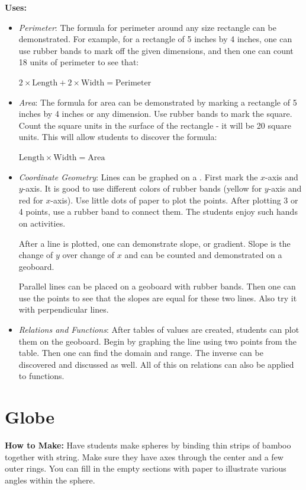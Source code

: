 \noindent\textbf{Uses:}
\begin{itemize}
\item \emph{Perimeter}: The formula for perimeter around any size rectangle can be demonstrated. For example, for a rectangle of 5 inches by 4 inches, one can use rubber bands to mark off the given dimensions, and then one can count 18 units of perimeter to see that:
\begin{center}
$2 \times \text{Length} + 2 \times \text{Width} = \text{Perimeter}$
\end{center}
\item \emph{Area}: The formula for area can be demonstrated by marking a rectangle of 5 inches by 4 inches or any dimension. Use rubber bands to mark the square. Count the square units in the surface of the rectangle - it will be 20 square units. This will allow students to discover the formula:
\begin{center}
$\text{Length} \times \text{Width} = \text{Area} $
\end{center}
\item \emph{Coordinate Geometry}: Lines can be graphed on a . First mark the $x$-axis and $y$-axis. It is good to use different colors of rubber bands (yellow for $y$-axis and red for $x$-axis). Use little dots of paper to plot the points. After plotting 3 or 4 points, use a rubber band to connect them. The students enjoy such hands on activities.

After a line is plotted, one can demonstrate slope, or gradient. Slope is the change of $y$ over change of $x$ and can be counted and demonstrated on a geoboard.

Parallel lines can be placed on a geoboard with rubber bands. Then one can use the points to see that the slopes are equal for these two lines. Also try it with perpendicular lines.
\item \emph{Relations and Functions}: After tables of values are created, students can plot them on the geoboard. Begin by graphing the line using two points from the table. Then one can find the domain and range. The inverse can be discovered and discussed as well. All of this on relations can also be applied to functions.
\end{itemize}

\section{Globe} \label{globe}
\textbf{How to Make:} Have students make spheres by binding thin strips of bamboo together with string. Make sure they have axes through the center and a few outer rings. You can fill in the empty sections with paper to illustrate various angles within the sphere.\\

